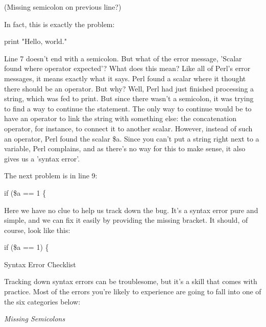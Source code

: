 \documentclass[a4paper,11pt]{book}
\begin{document}
\noindent 

\noindent 

\noindent (Missing semicolon on previous line?)

\noindent 

\noindent In fact, this is exactly the problem:

\noindent 

\noindent print "Hello, world."

\noindent 

\noindent Line 7 doesn't end with a semicolon. But what of the error message, 'Scalar found where operator expected'? What does this mean? Like all of Perl's error messages, it means exactly what it says. Perl found a scalar where it thought there should be an operator. But why? Well, Perl had just finished processing a string, which was fed to print. But since there wasn't a semicolon, it was trying to find a way to continue the statement. The only way to continue would be to have an operator to link the string with something else: the concatenation operator, for instance, to connect it to another scalar. However, instead of such an operator, Perl found the scalar \$a. Since you can't put a string right next to a variable, Perl complains, and as there's no way for this to make sense, it also gives us a 'syntax error'.

\noindent 

\noindent The next problem is in line 9:

\noindent 

\noindent if (\$a == 1 \{

\noindent 

\noindent Here we have no clue to help us track down the bug. It's a syntax error pure and simple, and we can fix it easily by providing the missing bracket. It should, of course, look like this:

\noindent 

\noindent if (\$a == 1) \{

\noindent 

\noindent 

\noindent Syntax Error Checklist

\noindent 

\noindent Tracking down syntax errors can be troublesome, but it's a skill that comes with practice. Most of the errors you're likely to experience are going to fall into one of the six categories below:

\noindent 

\noindent \textit{Missing Semicolons}
\end{document}
